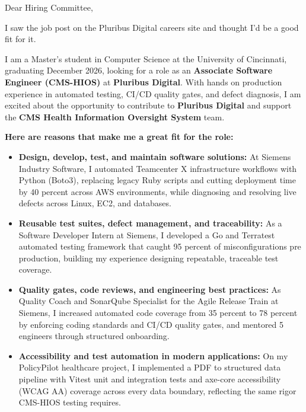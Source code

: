 \documentclass[11pt]{letter}
\date{}
\begin{document}
\begin{letter}{}

\opening{Dear Hiring Committee,}

I saw the job post on the Pluribus Digital careers site and thought I'd be a good fit for it.

I am a Master's student in Computer Science at the University of Cincinnati, graduating December 2026, looking for a role as an \textbf{Associate Software Engineer (CMS-HIOS)} at \textbf{Pluribus Digital}. With hands on production experience in automated testing, CI/CD quality gates, and defect diagnosis, I am excited about the opportunity to contribute to \textbf{Pluribus Digital} and support the \textbf{CMS Health Information Oversight System} team.

\textbf{Here are reasons that make me a great fit for the role:}

\begin{itemize}[leftmargin=*, itemsep=0.45em]
    \item \textbf{Design, develop, test, and maintain software solutions:} At Siemens Industry Software, I automated Teamcenter X infrastructure workflows with Python (Boto3), replacing legacy Ruby scripts and cutting deployment time by 40 percent across AWS environments, while diagnosing and resolving live defects across Linux, EC2, and databases.

    \item \textbf{Reusable test suites, defect management, and traceability:} As a Software Developer Intern at Siemens, I developed a Go and Terratest automated testing framework that caught 95 percent of misconfigurations pre production, building my experience designing repeatable, traceable test coverage.

    \item \textbf{Quality gates, code reviews, and engineering best practices:} As Quality Coach and SonarQube Specialist for the Agile Release Train at Siemens, I increased automated code coverage from 35 percent to 78 percent by enforcing coding standards and CI/CD quality gates, and mentored 5 engineers through structured onboarding.

    \item \textbf{Accessibility and test automation in modern applications:} On my PolicyPilot healthcare project, I implemented a PDF to structured data pipeline with Vitest unit and integration tests and axe-core accessibility (WCAG AA) coverage across every data boundary, reflecting the same rigor CMS-HIOS testing requires.


\end{itemize}
\end{letter}
\end{document}
